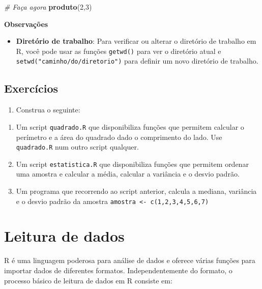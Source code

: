 \documentclass[
]{book}
\newenvironment{Shaded}{\begin{snugshade}}{\end{snugshade}}
\newcommand{\CommentTok}[1]{\textcolor[rgb]{0.56,0.35,0.01}{\textit{#1}}}
\newcommand{\DecValTok}[1]{\textcolor[rgb]{0.00,0.00,0.81}{#1}}
\newcommand{\FunctionTok}[1]{\textcolor[rgb]{0.13,0.29,0.53}{\textbf{#1}}}
\newcommand{\NormalTok}[1]{#1}
\providecommand{\tightlist}{%
  \setlength{\itemsep}{0pt}\setlength{\parskip}{0pt}}
\begin{document}
\begin{Shaded}
\begin{Highlighting}[]
\CommentTok{\# Faça agora}
\FunctionTok{produto}\NormalTok{(}\DecValTok{2}\NormalTok{,}\DecValTok{3}\NormalTok{)}
\end{Highlighting}
\end{Shaded}

\textbf{Observações}

\begin{itemize}
\tightlist
\item
  \textbf{Diretório de trabalho}: Para verificar ou alterar o diretório de trabalho em R, você pode usar as funções \texttt{getwd()} para ver o diretório atual e \texttt{setwd("caminho/do/diretorio")} para definir um novo diretório de trabalho.
\end{itemize}

\section{Exercícios}\label{exercuxedcios-6}

\begin{enumerate}
\def\labelenumi{\arabic{enumi}.}
\tightlist
\item
  Construa o seguinte:
\end{enumerate}

\begin{enumerate}
\def\labelenumi{(\alph{enumi})}
\item
  Um script \texttt{quadrado.R} que disponibiliza funções que permitem calcular o perímetro e a área do quadrado dado o comprimento do lado. Use \texttt{quadrado.R} num outro script qualquer.
\item
  Um script \texttt{estatistica.R} que disponibiliza funções que permitem ordenar uma amostra e calcular a média, calcular a variância e o desvio padrão.
\item
  Um programa que recorrendo ao script anterior, calcula a mediana, variância e o desvio padrão da amostra \texttt{amostra\ \textless{}-\ c(1,2,3,4,5,6,7)}
\end{enumerate}

\chapter{Leitura de dados}\label{leitura-de-dados}

R é uma linguagem poderosa para análise de dados e oferece várias funções para importar dados de diferentes formatos. Independentemente do formato, o processo básico de leitura de dados em R consiste em:
\end{document}

